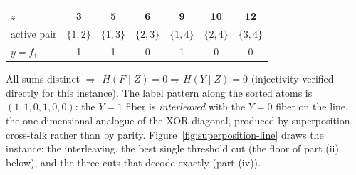 \documentclass[twocolumn,10pt]{article}
\theoremstyle{definition}
\theoremstyle{remark}
\begin{document}
\begin{center}
\footnotesize
\setlength{\tabcolsep}{3.4pt}
\begin{tabular}{lcccccc}
\toprule
$z$ & 3 & 5 & 6 & 9 & 10 & 12 \\
\midrule
active pair & $\{1,2\}$ & $\{1,3\}$ & $\{2,3\}$ & $\{1,4\}$ & $\{2,4\}$ & $\{3,4\}$ \\
$y = f_1$ & 1 & 1 & 0 & 1 & 0 & 0 \\
\bottomrule
\end{tabular}
\end{center}

All sums distinct $\Rightarrow$ $H(F \mid Z) = 0 \Rightarrow
H(Y \mid Z) = 0$ (injectivity verified directly for this instance). The
label pattern along the sorted atoms is $(1,1,0,1,0,0)$: the $Y{=}1$ fiber
is \emph{interleaved} with the $Y{=}0$ fiber on the line, the
one-dimensional analogue of the XOR diagonal, produced by superposition
cross-talk rather than by parity. Figure~\ref{fig:superposition-line}
draws the instance: the interleaving, the best single threshold cut (the
floor of part (ii) below), and the three cuts that decode exactly (part
(iv)).
\end{document}
